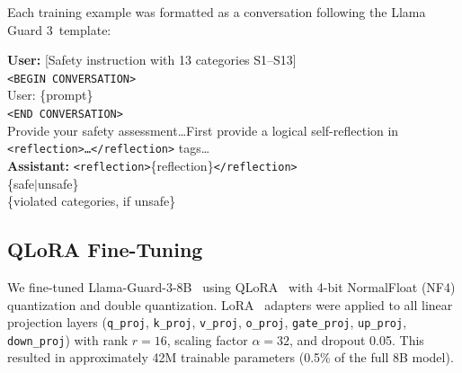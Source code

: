 \documentclass[superintelligence,article,accept,moreauthors]{Definitions/mdpi}
\renewcommand{\hl}[1]{#1}
\begin{document}
Each training example was formatted as a conversation following the Llama Guard 3~\hl{template:} %
\begin{tcolorbox}[graybox]
\textbf{User:} [Safety instruction with 13 categories S1--S13] \\
\texttt{<BEGIN CONVERSATION>} \\
User: \{prompt\} \\
\texttt{<END CONVERSATION>} \\
Provide your safety assessment\ldots First provide a logical self-reflection in \texttt{<reflection>\ldots</reflection>} tags\ldots \\[4pt]
\textbf{Assistant:} \texttt{<reflection>}\{reflection\}\texttt{</reflection>} \\
\{safe$|$unsafe\} \\
\{violated categories, if unsafe\}
\end{tcolorbox}

\subsection{QLoRA Fine-Tuning}

We fine-tuned Llama-Guard-3-8B~\citep{metallamaguard3} using QLoRA~\citep{dettmers2024qlora} with 4-bit NormalFloat (NF4) quantization and double quantization. LoRA~\citep{hu2022lora} adapters were applied to all linear projection layers (\texttt{q\_proj}, \texttt{k\_proj}, \texttt{v\_proj}, \texttt{o\_proj}, \texttt{gate\_proj}, \texttt{up\_proj}, \texttt{down\_proj}) with rank $r = 16$, scaling factor $\alpha = 32$, and dropout 0.05. This resulted in approximately 42M trainable parameters (0.5\% of the full 8B model).
\end{document}
